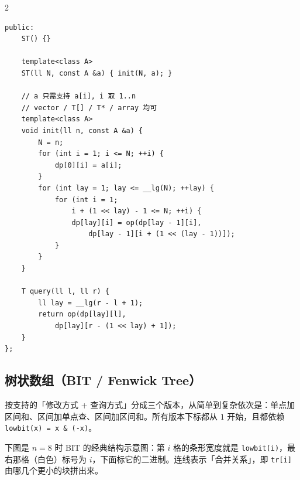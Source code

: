 \begin{multicols*}{2}
\begin{verbatim}
public:
	ST() {}

	template<class A>
	ST(ll N, const A &a) { init(N, a); }

	// a 只需支持 a[i], i 取 1..n
	// vector / T[] / T* / array 均可
	template<class A>
	void init(ll n, const A &a) {
		N = n;
		for (int i = 1; i <= N; ++i) {
			dp[0][i] = a[i];
		}
		for (int lay = 1; lay <= __lg(N); ++lay) {
			for (int i = 1;
				i + (1 << lay) - 1 <= N; ++i) {
				dp[lay][i] = op(dp[lay - 1][i],
					dp[lay - 1][i + (1 << (lay - 1))]);
			}
		}
	}

	T query(ll l, ll r) {
		ll lay = __lg(r - l + 1);
		return op(dp[lay][l],
			dp[lay][r - (1 << lay) + 1]);
	}
};
		\end{verbatim}

		\subsection{树状数组（BIT / Fenwick Tree）}

		按支持的「修改方式 + 查询方式」分成三个版本，从简单到复杂依次是：单点加区间和、区间加单点查、区间加区间和。所有版本下标都从 $1$ 开始，且都依赖 \verb|lowbit(x) = x & (-x)|。

		下图是 $n = 8$ 时 BIT 的经典结构示意图：第 $i$ 格的条形宽度就是 \verb|lowbit(i)|，最右那格（白色）标号为 $i$，下面标它的二进制。连线表示「合并关系」，即 \verb|tr[i]| 由哪几个更小的块拼出来。

		\begin{center}
\end{center}
\end{multicols*}
